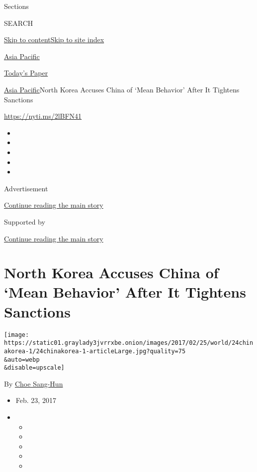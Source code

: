 Sections

SEARCH

\protect\hyperlink{site-content}{Skip to
content}\protect\hyperlink{site-index}{Skip to site index}

\href{https://www.nytimes3xbfgragh.onion/section/world/asia}{Asia
Pacific}

\href{https://myaccount.nytimes3xbfgragh.onion/auth/login?response_type=cookie\&client_id=vi}{}

\href{https://www.nytimes3xbfgragh.onion/section/todayspaper}{Today's
Paper}

\href{/section/world/asia}{Asia Pacific}\textbar{}North Korea Accuses
China of `Mean Behavior' After It Tightens Sanctions

\url{https://nyti.ms/2lBFN41}

\begin{itemize}
\item
\item
\item
\item
\item
\end{itemize}

Advertisement

\protect\hyperlink{after-top}{Continue reading the main story}

Supported by

\protect\hyperlink{after-sponsor}{Continue reading the main story}

\hypertarget{north-korea-accuses-china-of-mean-behavior-after-it-tightens-sanctions}{%
\section{North Korea Accuses China of `Mean Behavior' After It Tightens
Sanctions}\label{north-korea-accuses-china-of-mean-behavior-after-it-tightens-sanctions}}

\texttt{[image: https://static01.graylady3jvrrxbe.onion/images/2017/02/25/world/24chinakorea-1/24chinakorea-1-articleLarge.jpg?quality=75\\\&auto=webp\\\&disable=upscale]}

By \href{http://www.nytimes3xbfgragh.onion/by/choe-sang-hun}{Choe
Sang-Hun}

\begin{itemize}
\item
  Feb. 23, 2017
\item
  \begin{itemize}
  \item
  \item
  \item
  \item
  \item
  \end{itemize}
\end{itemize}


